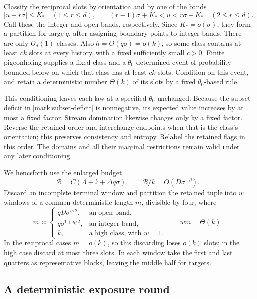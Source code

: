 Classify the reciprocal slots by orientation and by one of the bands
\[
 |u-r\sigma|\le K_*\quad(1\le r\le d),
 \qquad
 (r-1)\sigma+K_*<u<r\sigma-K_*\quad(2\le r\le d).
\]
Call these the integer and open bands, respectively. Since
$K_*=o(\sigma)$, they form a partition for large $q$, after assigning
boundary points to integer bands. There are only $O_d(1)$ classes.
Also $h=O(q\sigma)=o(k)$, so some class contains at least $ck$ slots
at every history, with a fixed sufficiently small $c>0$. Finite
pigeonholing supplies a fixed class and a $\theta_0$-determined event
of probability bounded below on which that class has at least $ck$
slots. Condition on this event, and retain a deterministic number
$\Theta(k)$ of its slots by a fixed $\theta_0$-based rule.

This conditioning leaves each law at a specified $\theta_0$ unchanged.
Because the subset deficit in \eqref{mark:subset-deficit} is
nonnegative, its expected value increases by at most a fixed factor.
Stream domination likewise changes only by a fixed factor. Reverse
the retained order and interchange endpoints when that is the class's
orientation; this preserves consistency and entropy. Relabel the
retained flags in this order. The domains and all their marginal
restrictions remain valid under any later conditioning.

We henceforth use the enlarged budget
\begin{equation}\label{mark:budget}
 \mathcal B=C(\Lambda+k+\Delta q\sigma),\qquad
 \mathcal B/k=O(D\sigma^{-\beta}).
\end{equation}
Discard an incomplete terminal window and partition the retained tuple
into $w$ windows of a common deterministic length $m$, divisible by four,
where
\begin{equation}\label{mark:windows}
 m\asymp
 \begin{cases}
 qD\sigma^{\eta/2},&\text{an open band},\\
 q\sigma^{1+\eta/2},&\text{an integer band},\\
 k,&\text{a high class, with }w=1.
 \end{cases}
 \qquad wm=\Theta(k).
\end{equation}
In the reciprocal cases $m=o(k)$, so this discarding loses $o(k)$ slots;
in the high case discard at most three slots. In each window take the
first and last quarters as representative blocks, leaving the middle
half for targets.

\subsection{A deterministic exposure round}

